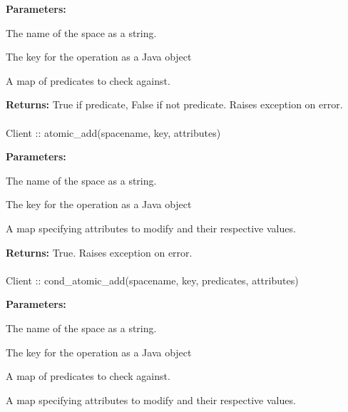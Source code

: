 \noindent\textbf{Parameters:}
\begin{description}[labelindent=\widthof{{\code{predicates}}},leftmargin=*,noitemsep,nolistsep,align=right]
\item[\code{spacename}] The name of the space as a string.
\item[\code{key}] The key for the operation as a Java object
\item[\code{predicates}] A map of predicates to check against.
\end{description}

\noindent\textbf{Returns:}
True if predicate, False if not predicate.  Raises exception on error.

\paragraph{}
\label{api:java:atomic_add}
\begin{javacode}
Client :: atomic_add(spacename, key, attributes)
\end{javacode}
\funcdesc 

\noindent\textbf{Parameters:}
\begin{description}[labelindent=\widthof{{\code{attributes}}},leftmargin=*,noitemsep,nolistsep,align=right]
\item[\code{spacename}] The name of the space as a string.
\item[\code{key}] The key for the operation as a Java object
\item[\code{attributes}] A map specifying attributes to modify and their respective values.
\end{description}

\noindent\textbf{Returns:}
True.  Raises exception on error.

\paragraph{}
\label{api:java:cond_atomic_add}
\begin{javacode}
Client :: cond_atomic_add(spacename, key, predicates, attributes)
\end{javacode}
\funcdesc 

\noindent\textbf{Parameters:}
\begin{description}[labelindent=\widthof{{\code{predicates}}},leftmargin=*,noitemsep,nolistsep,align=right]
\item[\code{spacename}] The name of the space as a string.
\item[\code{key}] The key for the operation as a Java object
\item[\code{predicates}] A map of predicates to check against.
\item[\code{attributes}] A map specifying attributes to modify and their respective values.
\end{description}

